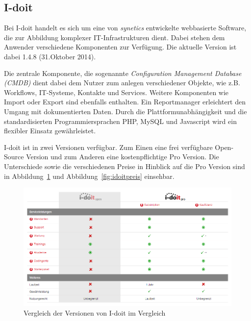 
\subsection{I-doit}

Bei I-doit handelt es sich um eine von \textit{synetics} entwickelte webbasierte Software, die zur Abbildung komplexer IT-Infrastrukturen dient.
Dabei stehen dem Anwender verschiedene Komponenten zur Verfügung. 
Die aktuelle Version ist dabei 1.4.8 (31.Oktober 2014). 

Die zentrale Komponente, die sogenannte \textit{Configuration Management Database (CMDB)} dient dabei dem Nutzer zum anlegen verschiedener Objekte, wie z.B. Workflows, IT-Systeme, 
Kontakte und Services.
Weitere Komponenten wie Import oder Export sind ebenfalls enthalten.
Ein Reportmanager erleichtert den Umgang mit dokumentierten Daten. 
Durch die Plattformunabhängigkeit und die standardisierten Programmiersprachen PHP, MySQL und Javascript wird ein flexibler Einsatz gewährleistet.

I-doit ist in zwei Versionen verfügbar. Zum Einen eine frei verfügbare Open-Source Version und zum Anderen eine kostenpflichtige Pro Version.
Die Unterschiede sowie die verschiedenen Preise in Hinblick auf die Pro Version sind in Abbildung~\ref{fig:idoitvergleich} und Abbildung~\ref{fig:idoitpreis} einsehbar.

\begin{figure}[htbp]
\includegraphics[width=\textwidth]{images/idoitvergleich}
\caption{Vergleich der Versionen von I-doit im Vergleich}
\label{fig:idoitvergleich}
\end{figure}

